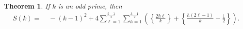\documentclass[11pt,reqno]{amsart}
\theoremstyle{plain}
\numberwithin{equation}{section}
\newtheorem{theorem}{Theorem}[section]
\begin{document}

\begin{theorem}\label{4.9theorem} If $k$ is an odd prime, then
\begin{align*}
S(k)
=&\; -(k-1)^2 + 4 \sum_{\ell=1}^{\frac{k-1}{2}}\sum_{h=1}^{\frac{k-1}{2}}\left(\left\{\frac{2h\ell}{k}\right\} + \left\{\frac{h(2\ell-1)}{k}-\frac{1}{2}\right\}\right).%
\end{align*}
\end{theorem}
\end{document}
